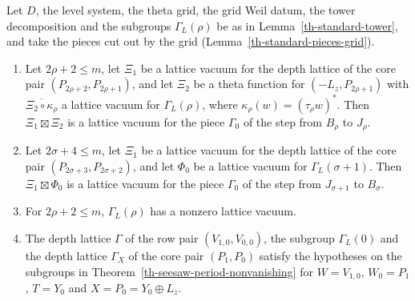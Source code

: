 \begin{lemma}\label{th-standard-lattices}
Let $D$, the level system, the theta grid, the grid Weil datum, the tower
decomposition and the subgroups $\Gamma_L(\rho)$ be as in
Lemma~\ref{th-standard-tower}, and take the pieces cut out by the grid
(Lemma~\ref{th-standard-pieces-grid}).
\begin{enumerate}
\item Let $2\rho+2\leq m$, let $\Xi_1$ be a lattice vacuum for the depth lattice of
  the core pair $(P_{2\rho+2},P_{2\rho+1})$, and let $\Xi_2$ be a theta function
  for $(-L_z,P_{2\rho+1})$ with $\overline{\Xi_2\circ\kappa_\rho}$ a lattice vacuum
  for $\Gamma_L(\rho)$, where $\kappa_\rho(w)=(\tau_\rho w)^*$. Then
  $\Xi_1\boxtimes\Xi_2$ is a lattice vacuum for the piece $\Gamma_0$ of the step
  from $B_\rho$ to $J_\rho$.
\item Let $2\sigma+4\leq m$, let $\Xi_1$ be a lattice vacuum for the depth lattice
  of the core pair $(P_{2\sigma+3},P_{2\sigma+2})$, and let $\Phi_0$ be a lattice
  vacuum for $\Gamma_L(\sigma+1)$. Then $\Xi_1\boxtimes\Phi_0$ is a lattice
  vacuum for the piece $\Gamma_0$ of the step from $J_{\sigma+1}$ to $B_\sigma$.
\item For $2\rho+2\leq m$, $\Gamma_L(\rho)$ has a nonzero lattice vacuum.
\item The depth lattice $\Gamma$ of the row pair $(V_{1,0},V_{0,0})$, the subgroup
  $\Gamma_L(0)$ and the depth lattice $\Gamma_X$ of the core pair $(P_1,P_0)$
  satisfy the hypotheses on the subgroups in
  Theorem~\ref{th-seesaw-period-nonvanishing} for $W=V_{1,0}$, $W_0=P_1$, $T=Y_0$
  and $X=P_0=Y_0\oplus L_z$.
\end{enumerate}
\end{lemma}
